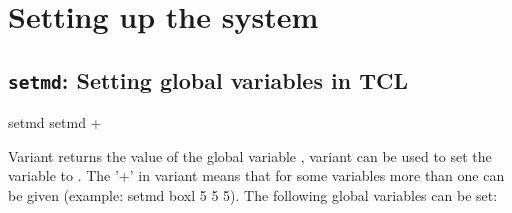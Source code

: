 %  
%   
%  
%  
%
\chapter{Setting up the system}
\label{chap:setup}

\section{\texttt{setmd}: Setting global variables in TCL}

\begin{essyntax}
 setmd 
 setmd  +
\end{essyntax}

Variant  returns the value of the \es global variable
, variant  can be used to set the variable
 to . The '+' in variant  means
that for some variables more than one  can be given
(example: setmd boxl 5 5 5). The following global variables can be
set:

\newenvironment{globvar}{
  \begin{list}{}{
      \setlength{\rightmargin}{1em}
      \setlength{\leftmargin}{2em}
      \setlength{\partopsep}{0pt}
      \setlength{\topsep}{1ex}
      \setlength{\parsep}{0.5ex}
      \setlength{\listparindent}{-1em}
      \setlength{\labelwidth}{0.5em}
      \setlength{\labelsep}{0.5em}
      \renewcommand{\makelabel}[1]{%
        \index{##1@\texttt{##1} (global variable)|mainindex}%
        \index{global variables!\texttt{##1}|mainindex}%
        \texttt{##1}%
      }
    }
  }{
  \end{list}
}
\newcommand{\ro}{\emph{read-only}}

